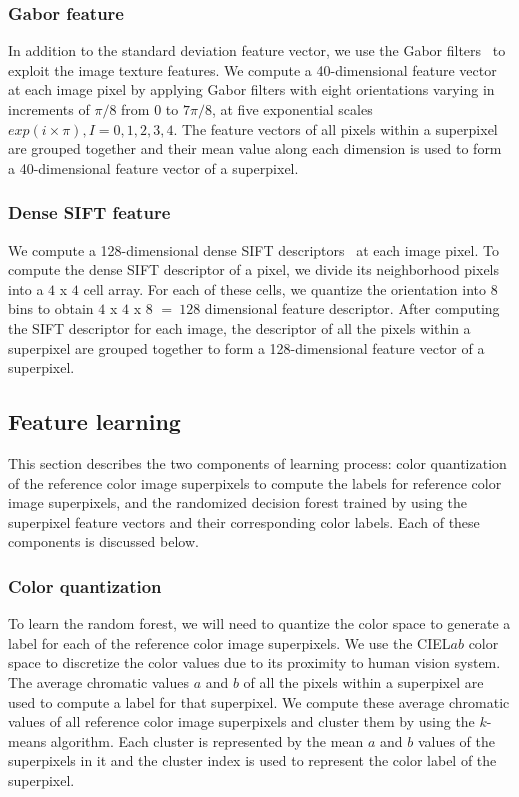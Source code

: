 \documentclass[twocolumn]{svjour3}          %
\begin{document}
\subsubsection{Gabor feature}
 In addition to the standard deviation feature vector, we use the Gabor filters~\cite{BS96} to exploit the image texture features. We compute a 40-dimensional feature vector at each image pixel by applying Gabor filters with eight orientations varying in increments of $\pi/8$ from 0 to $7\pi/8$, at five exponential scales $exp(i \times \pi), I = 0, 1, 2, 3, 4$. The feature vectors of all pixels within a superpixel are grouped together and their mean value along each dimension is used to form a  40-dimensional feature vector of a superpixel.  

\subsubsection{Dense SIFT feature}
We compute a 128-dimensional dense SIFT descriptors~\cite{Liu11} at each image pixel. To compute the dense SIFT descriptor of a pixel, we divide its neighborhood pixels into a $4$ x $4$ cell array. For each of these cells, we quantize the orientation into 8 bins to obtain $4$ x $4$ x $8$ $=\ 128$ dimensional feature descriptor. After computing the SIFT descriptor for each image, the descriptor of all the pixels within a superpixel are grouped together to form a 128-dimensional feature vector of a superpixel.

\subsection{Feature learning}
This section describes the two components of learning process: color quantization of the reference color image superpixels to compute the labels for reference color image superpixels, and the randomized decision forest trained by using the superpixel feature vectors and their corresponding color labels. Each of these components is discussed below.

\subsubsection{Color quantization}
\label{sec:quantization}
To learn the random forest, we will need to quantize the color space to generate a label for each of the reference color image superpixels. We use the CIEL$ab$ color space to discretize the color values due to its proximity to human vision system. The average chromatic values $a$ and $b$ of all the pixels within a superpixel are used to compute a label for that superpixel. We compute these average chromatic values of all reference color image superpixels and cluster them by using the $k$-means algorithm. Each cluster is represented by the mean $a$ and $b$ values of the superpixels in it and the cluster index is used to represent the color label of the superpixel.
\end{document}
